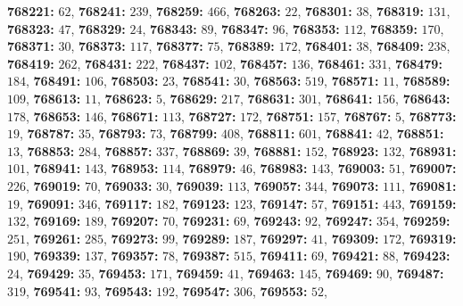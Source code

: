\textsf{\bfseries 768221:} $62$, \textsf{\bfseries 768241:} $239$, \textsf{\bfseries 768259:} $466$, \textsf{\bfseries 768263:} $22$, \textsf{\bfseries 768301:} $38$, \textsf{\bfseries 768319:} $131$, \textsf{\bfseries 768323:} $47$, \textsf{\bfseries 768329:} $24$, \textsf{\bfseries 768343:} $89$, \textsf{\bfseries 768347:} $96$, \textsf{\bfseries 768353:} $112$, \textsf{\bfseries 768359:} $170$, \textsf{\bfseries 768371:} $30$, \textsf{\bfseries 768373:} $117$, \textsf{\bfseries 768377:} $75$, \textsf{\bfseries 768389:} $172$, \textsf{\bfseries 768401:} $38$, \textsf{\bfseries 768409:} $238$, \textsf{\bfseries 768419:} $262$, \textsf{\bfseries 768431:} $222$, \textsf{\bfseries 768437:} $102$, \textsf{\bfseries 768457:} $136$, \textsf{\bfseries 768461:} $331$, \textsf{\bfseries 768479:} $184$, \textsf{\bfseries 768491:} $106$, \textsf{\bfseries 768503:} $23$, \textsf{\bfseries 768541:} $30$, \textsf{\bfseries 768563:} $519$, \textsf{\bfseries 768571:} $11$, \textsf{\bfseries 768589:} $109$, \textsf{\bfseries 768613:} $11$, \textsf{\bfseries 768623:} $5$, \textsf{\bfseries 768629:} $217$, \textsf{\bfseries 768631:} $301$, \textsf{\bfseries 768641:} $156$, \textsf{\bfseries 768643:} $178$, \textsf{\bfseries 768653:} $146$, \textsf{\bfseries 768671:} $113$, \textsf{\bfseries 768727:} $172$, \textsf{\bfseries 768751:} $157$, \textsf{\bfseries 768767:} $5$, \textsf{\bfseries 768773:} $19$, \textsf{\bfseries 768787:} $35$, \textsf{\bfseries 768793:} $73$, \textsf{\bfseries 768799:} $408$, \textsf{\bfseries 768811:} $601$, \textsf{\bfseries 768841:} $42$, \textsf{\bfseries 768851:} $13$, \textsf{\bfseries 768853:} $284$, \textsf{\bfseries 768857:} $337$, \textsf{\bfseries 768869:} $39$, \textsf{\bfseries 768881:} $152$, \textsf{\bfseries 768923:} $132$, \textsf{\bfseries 768931:} $101$, \textsf{\bfseries 768941:} $143$, \textsf{\bfseries 768953:} $114$, \textsf{\bfseries 768979:} $46$, \textsf{\bfseries 768983:} $143$, \textsf{\bfseries 769003:} $51$, \textsf{\bfseries 769007:} $226$, \textsf{\bfseries 769019:} $70$, \textsf{\bfseries 769033:} $30$, \textsf{\bfseries 769039:} $113$, \textsf{\bfseries 769057:} $344$, \textsf{\bfseries 769073:} $111$, \textsf{\bfseries 769081:} $19$, \textsf{\bfseries 769091:} $346$, \textsf{\bfseries 769117:} $182$, \textsf{\bfseries 769123:} $123$, \textsf{\bfseries 769147:} $57$, \textsf{\bfseries 769151:} $443$, \textsf{\bfseries 769159:} $132$, \textsf{\bfseries 769169:} $189$, \textsf{\bfseries 769207:} $70$, \textsf{\bfseries 769231:} $69$, \textsf{\bfseries 769243:} $92$, \textsf{\bfseries 769247:} $354$, \textsf{\bfseries 769259:} $251$, \textsf{\bfseries 769261:} $285$, \textsf{\bfseries 769273:} $99$, \textsf{\bfseries 769289:} $187$, \textsf{\bfseries 769297:} $41$, \textsf{\bfseries 769309:} $172$, \textsf{\bfseries 769319:} $190$, \textsf{\bfseries 769339:} $137$, \textsf{\bfseries 769357:} $78$, \textsf{\bfseries 769387:} $515$, \textsf{\bfseries 769411:} $69$, \textsf{\bfseries 769421:} $88$, \textsf{\bfseries 769423:} $24$, \textsf{\bfseries 769429:} $35$, \textsf{\bfseries 769453:} $171$, \textsf{\bfseries 769459:} $41$, \textsf{\bfseries 769463:} $145$, \textsf{\bfseries 769469:} $90$, \textsf{\bfseries 769487:} $319$, \textsf{\bfseries 769541:} $93$, \textsf{\bfseries 769543:} $192$, \textsf{\bfseries 769547:} $306$, \textsf{\bfseries 769553:} $52$, 
